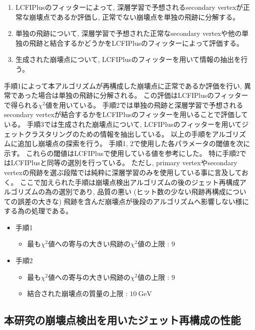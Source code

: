 \begin{enumerate}
 \item LCFIPlusのフィッターによって, 深層学習で予想されるsecondary vertexが正常な崩壊点であるか評価し, 正常でない崩壊点を単独の飛跡に分解する。
 \item 単独の飛跡について, 深層学習で予想された正常なsecondary vertexや他の単独の飛跡と結合するかどうかをLCFIPlusのフィッターによって評価する。
 \item 生成された崩壊点について, LCFIPlusのフィッターを用いて情報の抽出を行う。
\end{enumerate}

手順1によって本アルゴリズムが再構成した崩壊点に正常であるか評価を行い, 異常であった場合は単独の飛跡に分解される。
この評価はLCFIPlusのフィッターで得られる$\chi^2$値を用いている。
手順2では単独の飛跡と深層学習で予想されるsecondary vertexが結合するかをLCFIPlusのフィッターを用いることで評価している。
手順3では生成された崩壊点について, LCFIPlusのフィッターを用いてジェットクラスタリングのための情報を抽出している。
以上の手順をアルゴリズムに追加し崩壊点の探索を行う。
手順1, 2で使用した各パラメータの閾値を次に示す。
これらの閾値はLCFIPlusで使用している値を参考にした。
特に手順2ではLCFIPlusと同等の選別を行っている。
ただし, primary vertexやsecondary vertexの飛跡を選ぶ段階では純粋に深層学習のみを使用している事に言及しておく。
ここで加えられた手順は崩壊点検出アルゴリズムの後のジェット再構成アルゴリズムの為の選別であり, 品質の悪い (ヒット数の少ない飛跡再構成についての誤差の大きな) 飛跡を含んだ崩壊点が後段のアルゴリズムへ影響しない様にする為の処理である。

\begin{itemize}
 \item 手順1
 \begin{itemize}
  \item 最も$\chi^2$値への寄与の大きい飛跡の$\chi^2$値の上限 : $9$
 \end{itemize}
 \item 手順2
 \begin{itemize}
  \item 最も$\chi^2$値への寄与の大きい飛跡の$\chi^2$値の上限 : $9$
  \item 結合された崩壊点の質量の上限 : $10\ \mathrm{GeV}$
 \end{itemize}
\end{itemize}


\subsection{本研究の崩壊点検出を用いたジェット再構成の性能} \label{Com:FlaTagCom:PerformanceofFlavorTagging}

